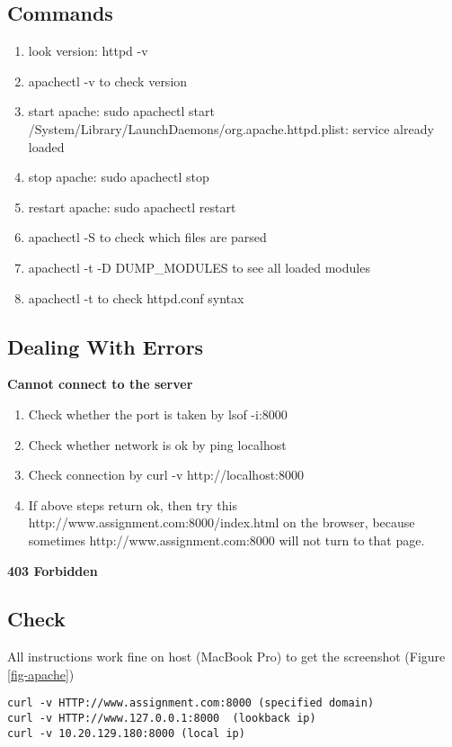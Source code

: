     \subsection{Commands}
        \begin{enumerate}
            \item look version: \colorbox{gray!30}{httpd -v}
            \item \colorbox{gray!30}{apachectl -v} to check version
            \item start apache: \colorbox{gray!30}{sudo apachectl start} \\
            /System/Library/LaunchDaemons/org.apache.httpd.plist: service already loaded
            \item stop apache: \colorbox{gray!30}{sudo apachectl stop}
            \item restart apache: \colorbox{gray!30}{sudo apachectl restart}
            \item \colorbox{gray!30}{apachectl -S} to check which files are parsed
            \item \colorbox{gray!30}{apachectl -t -D DUMP\_MODULES} to see all loaded modules
            \item \colorbox{gray!30}{apachectl -t} to check httpd.conf syntax  
        \end{enumerate}
        
        
    \subsection{Dealing With Errors}
        \textbf{Cannot connect to the server} 
        \begin{enumerate}
        \item Check whether the port is taken by \colorbox{gray!30}{lsof -i:8000}
        \item Check whether network is ok by \colorbox{gray!30}{ping localhost}
        \item Check connection by \colorbox{gray!30}{curl -v http://localhost:8000}
        \item If above steps return ok, then try this http://www.assignment.com:8000/index.html on the browser, because sometimes http://www.assignment.com:8000 will not turn to that page.
        \end{enumerate}
        \textbf{403 Forbidden} 
        
        
    \subsection{Check}
        All instructions work fine on host (MacBook Pro) to get the screenshot (Figure \ref{fig-apache})
\begin{lstlisting}
curl -v HTTP://www.assignment.com:8000 (specified domain)
curl -v HTTP://www.127.0.0.1:8000  (lookback ip)
curl -v 10.20.129.180:8000 (local ip)
\end{lstlisting}
  
    
